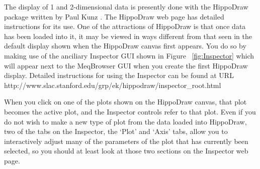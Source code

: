 \documentclass[10pt]{article}
\begin{document}
The display of 1 and 2-dimensional data is presently done with the
HippoDraw package written by Paul Kunz \cite{kunz}. The HippoDraw web 
page \cite{kunz} has
detailed instructions for its use. One of the attractions 
of HippoDraw is that once data has been loaded into it, it may be 
viewed in ways different from that seen in the default display
shown when the HippoDraw canvas first appears. You do so by making
use of the anciliary Inspector GUI shown in Figure  ~\ref{fig:Inspector} which
will appear next to the MeqBrowser GUI when you create 
the first HippoDraw display. Detailed instructions for using
the Inspector can be found at 
URL http://www.slac.stanford.edu/grp/ek/hippodraw/inspector\_root.html

When you click on one of the plots shown on the HippoDraw canvas,
that plot becomes the active plot, and the Inspector controls
refer to that plot. 
Even if you do not wish to make a new type of plot from the
data loaded into HippoDraw, two of the tabs on the Inspector, the
`Plot' and `Axis' tabs, allow you to interactively adjust many of the
parameters of the plot that has currently been selected, so you
should at least look at those two sections on the Inspector  
web page.
\end{document}
